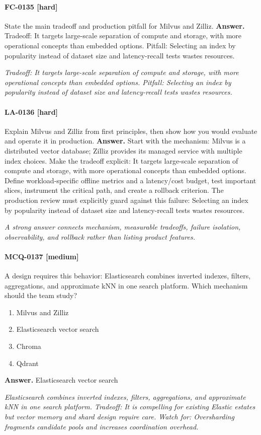 \paragraph{FC-0135 [hard]} State the main tradeoff and production pitfall for Milvus and Zilliz.
\noindent\textbf{Answer.} Tradeoff: It targets large-scale separation of compute and storage, with more operational concepts than embedded options. Pitfall: Selecting an index by popularity instead of dataset size and latency-recall tests wastes resources.
\par\textit{Tradeoff: It targets large-scale separation of compute and storage, with more operational concepts than embedded options. Pitfall: Selecting an index by popularity instead of dataset size and latency-recall tests wastes resources.}
\paragraph{LA-0136 [hard]} Explain Milvus and Zilliz from first principles, then show how you would evaluate and operate it in production.
\noindent\textbf{Answer.} Start with the mechanism: Milvus is a distributed vector database; Zilliz provides its managed service with multiple index choices. Make the tradeoff explicit: It targets large-scale separation of compute and storage, with more operational concepts than embedded options. Define workload-specific offline metrics and a latency/cost budget, test important slices, instrument the critical path, and create a rollback criterion. The production review must explicitly guard against this failure: Selecting an index by popularity instead of dataset size and latency-recall tests wastes resources.
\par\textit{A strong answer connects mechanism, measurable tradeoffs, failure isolation, observability, and rollback rather than listing product features.}
\paragraph{MCQ-0137 [medium]} A design requires this behavior: Elasticsearch combines inverted indexes, filters, aggregations, and approximate kNN in one search platform. Which mechanism should the team study?
\begin{enumerate}[label=\Alph*.]
\item Milvus and Zilliz
\item Elasticsearch vector search
\item Chroma
\item Qdrant
\end{enumerate}
\noindent\textbf{Answer.} Elasticsearch vector search
\par\textit{Elasticsearch combines inverted indexes, filters, aggregations, and approximate kNN in one search platform. Tradeoff: It is compelling for existing Elastic estates but vector memory and shard design require care. Watch for: Oversharding fragments candidate pools and increases coordination overhead.}
